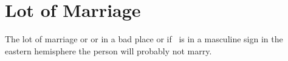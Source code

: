 \section{Lot of Marriage}
The lot of marriage \Opposition\Venus or \Opposition\Asc or in a bad place or if \Venus\, is in a masculine sign in the eastern hemisphere the person will probably not marry.